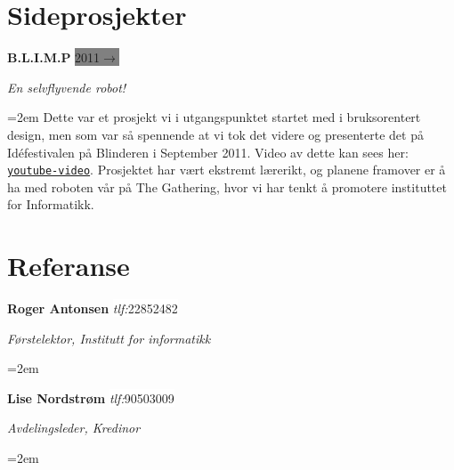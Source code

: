 \documentclass[paper=a4, fontsize=11pt]{scrartcl}
\newcommand{\sepspace}{\vspace*{1em}}
\newcommand{\EducationEntry}[4]{ 
    \noindent \textbf{#1} \hfill 
    \colorbox{Grey}{%
        \parbox{6em}{%
        \hfill\color{White}#2}} \par 
    \noindent \textit{#3} \par 
    \noindent\hangindent=2em\hangafter=0 \small #4 
    \normalsize \par}
\newcommand{\WorkEntry}[4]{						%
		\noindent \textbf{#1} \hfill 					%
		\colorbox{Grey}{\color{White}#2} \par		%
		\noindent \textit{#3} \par					%
		\noindent\hangindent=2em\hangafter=0 \small #4 	%
		\normalsize \par}
\newcommand{\ReferenceEntry}[4]{						%
		\noindent \textbf{#1} \hfill 					%
		\colorbox{White}{\color{Black}#2} \par		%
		\noindent \textit{#3} \par					%
		\noindent\hangindent=2em\hangafter=0 \small #4 	%
		\normalsize \par}
\begin{document}
\sepspace
\sepspace
\section*{Sideprosjekter}
\WorkEntry
{B.L.I.M.P}
{2011$\rightarrow$}
{En selvflyvende robot!}
{Dette var et prosjekt vi i utgangspunktet startet med i bruksorentert
design, men som var så spennende at vi tok det videre og presenterte det
på Idéfestivalen på Blinderen i September 2011. Video av dette kan sees
her: \href{http://www.bit.ly/ifiblimp}{\tt{youtube-video}}. Prosjektet
har vært ekstremt lærerikt, og planene framover er å ha med roboten vår
på The Gathering, hvor vi har tenkt å promotere instituttet for
Informatikk.}

\sepspace
\sepspace
\section*{Referanse}
\ReferenceEntry
{Roger Antonsen}
{\textit{tlf:}22852482}
{Førstelektor, Institutt for informatikk}
{}
\ReferenceEntry
{Lise Nordstrøm}
{\textit{tlf:}90503009}
{Avdelingsleder, Kredinor}
{}
\end{document}
